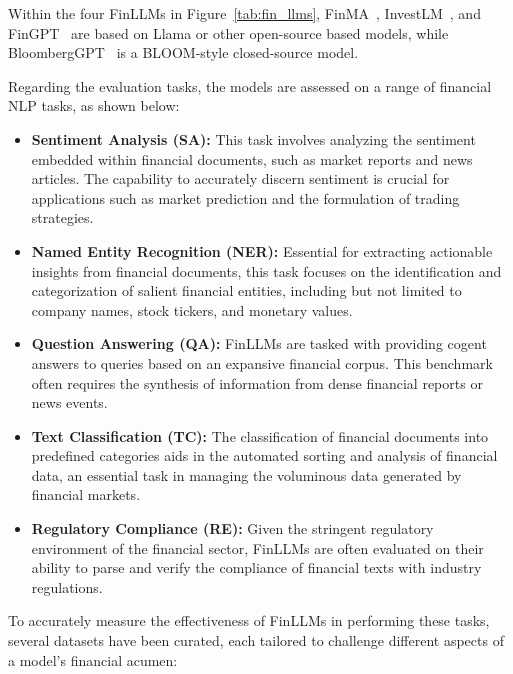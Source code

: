 Within the four FinLLMs in Figure~\ref{tab:fin_llms}, FinMA~\cite{xie2023pixiu}, InvestLM~\cite{yang2023investlm}, and FinGPT~\cite{wang2023fingpt} are based on Llama or other open-source based models, while BloombergGPT~\cite{wu2023bloomberggpt} is a BLOOM-style closed-source model.

Regarding the evaluation tasks, the models are assessed on a range of financial NLP tasks, as shown below:

\begin{itemize}
	\item \textbf{Sentiment Analysis (SA):} {This task involves analyzing the sentiment embedded within financial documents, such as market reports and news articles. The capability to accurately discern sentiment is crucial for applications such as market prediction and the formulation of trading strategies.}

	\item \textbf{Named Entity Recognition (NER):} {Essential for extracting actionable insights from financial documents, this task focuses on the identification and categorization of salient financial entities, including but not limited to company names, stock tickers, and monetary values.}

	\item \textbf{Question Answering (QA):} {FinLLMs are tasked with providing cogent answers to queries based on an expansive financial corpus. This benchmark often requires the synthesis of information from dense financial reports or news events.}

	\item \textbf{Text Classification (TC):} {The classification of financial documents into predefined categories aids in the automated sorting and analysis of financial data, an essential task in managing the voluminous data generated by financial markets.}

	\item \textbf{Regulatory Compliance (RE):} {Given the stringent regulatory environment of the financial sector, FinLLMs are often evaluated on their ability to parse and verify the compliance of financial texts with industry regulations.}
\end{itemize}

To accurately measure the effectiveness of FinLLMs in performing these tasks, several datasets have been curated, each tailored to challenge different aspects of a model's financial acumen:

